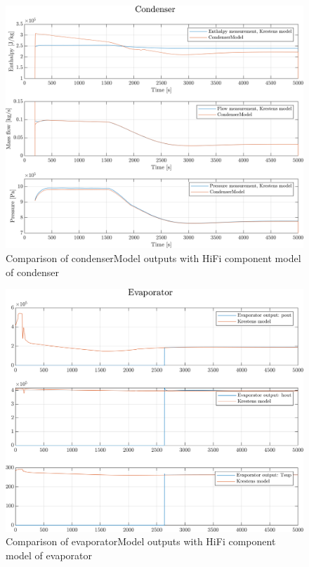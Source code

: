 \begin{figure}[h]
	\centering
	\includegraphics[width=1\textwidth]{Graphics/comp_test_con.png}
	\caption{Comparison of condenserModel outputs with HiFi component model of condenser}
	\label{fig:component_test_con}
\end{figure}
\begin{figure}[h]
	\centering
	\includegraphics[width=1\textwidth]{Graphics/comp_test_eva.png}
	\caption{Comparison of evaporatorModel outputs with HiFi component model of evaporator}
	\label{fig:component_test_eva}
\end{figure}
